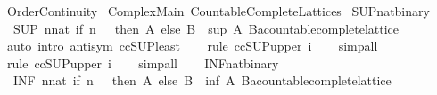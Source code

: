 %
\begin{isabellebody}%
%
%
\isadelimdocument
%
\endisadelimdocument
%
\isatagdocument
%
\isamarkuptrue%
%
\endisatagdocument
{\isafolddocument}%
%
\isadelimdocument
%
\endisadelimdocument
%
\isadelimtheory
%
\endisadelimtheory
%
\isatagtheory
{}\isamarkupfalse%
\ Order{\isacharunderscore}Continuity\isanewline
{}\ Complex{\isacharunderscore}Main\ Countable{\isacharunderscore}Complete{\isacharunderscore}Lattices\isanewline
{}%
\endisatagtheory
{\isafoldtheory}%
%
\isadelimtheory
\isanewline
%
\endisadelimtheory
\isanewline
\isanewline
\isanewline
{}\isamarkupfalse%
\ SUP{\isacharunderscore}nat{\isacharunderscore}binary{\isacharcolon}\isanewline
\ \ {\isachardoublequoteopen}{\isacharparenleft}SUP\ n{\isacharcolon}{\isacharcolon}nat{\isachardot}\ if\ n\ {\isacharequal}\ {}\ then\ A\ else\ B{\isacharparenright}\ {\isacharequal}\ {\isacharparenleft}sup\ A\ B{\isacharcolon}{\isacharcolon}{\isacharprime}a{\isacharcolon}{\isacharcolon}countable{\isacharunderscore}complete{\isacharunderscore}lattice{\isacharparenright}{\isachardoublequoteclose}\isanewline
%
\isadelimproof
\ \ %
\endisadelimproof
%
\isatagproof
{}\isamarkupfalse%
\ {\isacharparenleft}auto\ intro{\isacharbang}{\isacharcolon}\ antisym\ ccSUP{\isacharunderscore}least{\isacharparenright}\isanewline
\ \ \isamarkupfalse%
\ {\isacharparenleft}rule\ ccSUP{\isacharunderscore}upper{}{\isacharbrackleft}\ i{\isacharequal}{}{\isacharbrackright}{\isacharparenright}\isanewline
\ \ \isamarkupfalse%
\ simp{\isacharunderscore}all\isanewline
\ \ \isamarkupfalse%
\ {\isacharparenleft}rule\ ccSUP{\isacharunderscore}upper{}{\isacharbrackleft}\ i{\isacharequal}{}{\isacharbrackright}{\isacharparenright}\isanewline
\ \ \isamarkupfalse%
\ simp{\isacharunderscore}all\isanewline
\ \ \isamarkupfalse%
%
\endisatagproof
{\isafoldproof}%
%
\isadelimproof
\isanewline
%
\endisadelimproof
\isanewline
{}\isamarkupfalse%
\ INF{\isacharunderscore}nat{\isacharunderscore}binary{\isacharcolon}\isanewline
\ \ {\isachardoublequoteopen}{\isacharparenleft}INF\ n{\isacharcolon}{\isacharcolon}nat{\isachardot}\ if\ n\ {\isacharequal}\ {}\ then\ A\ else\ B{\isacharparenright}\ {\isacharequal}\ {\isacharparenleft}inf\ A\ B{\isacharcolon}{\isacharcolon}{\isacharprime}a{\isacharcolon}{\isacharcolon}countable{\isacharunderscore}complete{\isacharunderscore}lattice{\isacharparenright}{\isachardoublequoteclose}\isanewline

\end{isabellebody}
